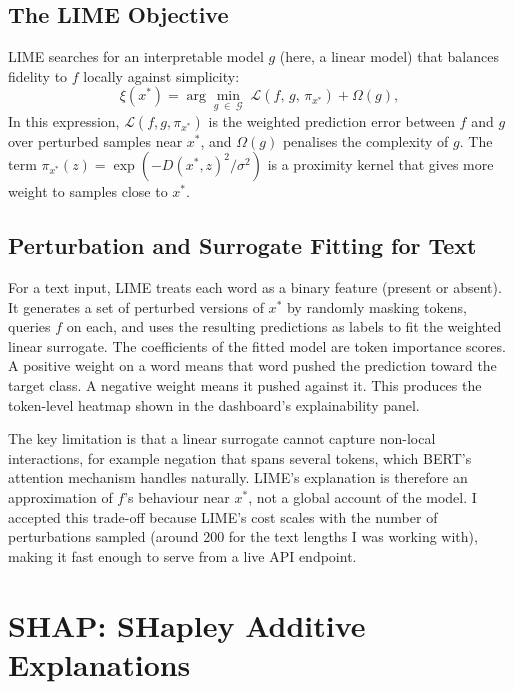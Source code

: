 \subsection{The LIME Objective}

LIME searches for an interpretable model $g$ (here, a linear model) that balances
fidelity to $f$ locally against simplicity:
\begin{equation}
  \xi(x^*)
  = \arg\min_{g \;\in\; \mathcal{G}}
    \;\mathcal{L}(f,\,g,\,\pi_{x^*}) + \Omega(g),
  \label{eq:lime_obj}
\end{equation}
In this expression, $\mathcal{L}(f, g, \pi_{x^*})$ is the weighted prediction error
between $f$ and $g$ over perturbed samples near $x^*$, and $\Omega(g)$ penalises the
complexity of $g$. The term $\pi_{x^*}(z) = \exp(-D(x^*, z)^2 / \sigma^2)$ is a proximity
kernel that gives more weight to samples close to $x^*$.

\subsection{Perturbation and Surrogate Fitting for Text}

For a text input, LIME treats each word as a binary feature (present or absent).
It generates a set of perturbed versions of $x^*$ by randomly masking tokens, queries $f$
on each, and uses the resulting predictions as labels to fit the weighted linear surrogate.
The coefficients of the fitted model are token importance scores. A positive weight on a
word means that word pushed the prediction toward the target class. A negative weight
means it pushed against it.
This produces the token-level heatmap shown in the dashboard's explainability panel.

The key limitation is that a linear surrogate cannot capture non-local interactions,
for example negation that spans several tokens, which BERT's attention mechanism
handles naturally.
LIME's explanation is therefore an approximation of $f$'s behaviour near $x^*$, not a
global account of the model.
I accepted this trade-off because LIME's cost scales with the number of perturbations
sampled (around 200 for the text lengths I was working with), making it fast enough to
serve from a live API endpoint.

\section{SHAP: SHapley Additive Explanations}

